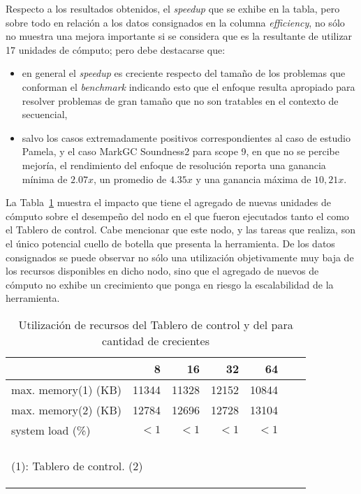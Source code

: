 Respecto a los resultados obtenidos, el \emph{speedup} que se exhibe en la tabla, pero sobre todo en relación a los datos consignados en la columna \emph{efficiency}, no sólo no muestra una mejora importante si se considera que es la resultante de utilizar 17 unidades de cómputo; pero debe destacarse que:
\begin{itemize}
\item en general el \emph{speedup} es creciente respecto del tamaño de los problemas que conforman el \emph{benchmark} indicando esto que el enfoque resulta apropiado para resolver problemas de gran tamaño que no son tratables en el contexto de \ssolving secuencial,
\item salvo los casos extremadamente positivos correspondientes al caso de estudio Pamela, y el caso MarkGC Soundness2 para scope 9, en que no se percibe mejoría, el rendimiento del enfoque de resolución reporta una ganancia mínima de $2.07x$, un promedio de $4.35x$ y una ganancia máxima de $10,21x$.
\end{itemize}

La Tabla~\ref{tab:incremental} muestra el impacto que tiene el agregado de
nuevas unidades de cómputo sobre el desempeño del nodo en el que fueron
ejecutados tanto el \master como el Tablero de control. Cabe mencionar que
este nodo, y las tareas que realiza, son el único potencial cuello de botella
que presenta la herramienta. De los datos consignados se puede observar no
sólo una utilización objetivamente muy baja de los recursos disponibles en
dicho nodo, sino que el agregado de nuevos \w de cómputo no exhibe un
crecimiento que ponga en riesgo la escalabilidad de la herramienta.

\begin{table}
	\centering
	\begin{tabular}{lrrrrrr}
		
			\ws 				&	8 		&	16		&	32 		&	64	\\
		\toprule	
			max. memory(1) (KB)	&	11344	&	11328	&	12152	&	10844 \\
			max. memory(2) (KB)	&	12784	&	12696	&	12728 	&	13104 \\
			system load	(\%)	&	$<1$	&	$<1$	&	$<1$ 	&	$<1$ \\
		\bottomrule \\
		\multicolumn{5}{l}{\begin{tiny}(1): Tablero de control. (2) \master \end{tiny}}
	\end{tabular}
	\caption{Utilización de recursos del Tablero de control y del \master para cantidad de \ws crecientes}
	\label{tab:incremental}
\end{table}

